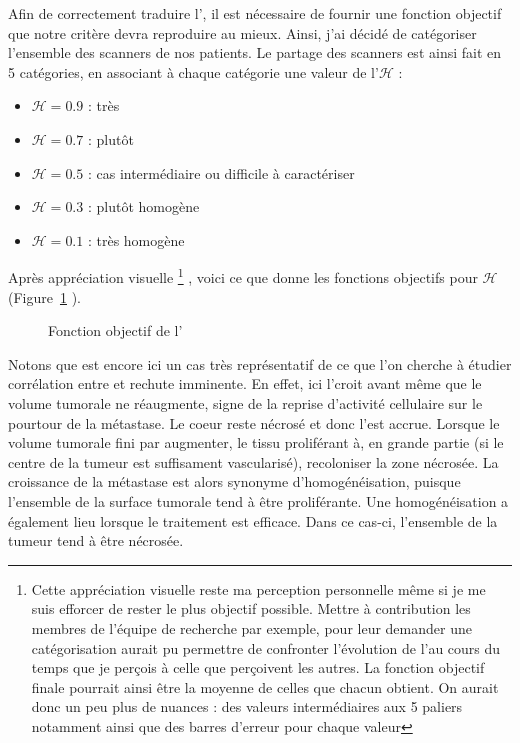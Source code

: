 \documentclass[main.tex]{subfiles}
\begin{document}
Afin de correctement traduire l'\hetero, il est nécessaire de fournir une fonction objectif que notre critère devra reproduire au mieux. Ainsi, j'ai décidé de catégoriser l'ensemble des scanners de nos patients. Le partage des scanners est ainsi fait en 5 catégories, en associant à chaque catégorie une valeur de l'\hetero $\mathscr{H}$ :
\begin{itemize}
\item $\mathscr{H}=0.9$ : très \heterogene
\item $\mathscr{H}=0.7$ : plutôt \heterogene
\item $\mathscr{H}=0.5$ : cas intermédiaire ou difficile à caractériser
\item $\mathscr{H}=0.3$ : plutôt homogène
\item  $\mathscr{H}=0.1$ : très homogène
\end{itemize}
Après appréciation visuelle \footnote{\samepage Cette appréciation visuelle reste ma perception personnelle même si je me suis efforcer de rester le plus objectif possible. Mettre à contribution les membres de l'équipe de recherche par exemple, pour leur demander une catégorisation aurait pu permettre de confronter l'évolution de l'\hetero au cours du temps que je perçois à celle que perçoivent les autres. La fonction objectif finale pourrait ainsi être la moyenne de celles que chacun obtient. On aurait donc un peu plus de nuances : des valeurs intermédiaires aux 5 paliers notamment ainsi que des barres d'erreur pour chaque valeur}
, voici ce que donne les fonctions objectifs pour $\mathscr{H}$ (\cf  Figure~\ref{fig:hetero_visuelle} ).

\begin{figure}
\caption{\label{fig:hetero_visuelle}Fonction objectif de l'\hetero}
\end{figure}

Notons que \Nber est encore ici un cas très représentatif de ce que l'on cherche à étudier \ie corrélation entre \hetero et rechute imminente. En effet, ici l'\hetero croit avant même que le volume tumorale ne réaugmente, signe de la reprise d'activité cellulaire sur le pourtour de la métastase. Le coeur reste nécrosé et donc l'\hetero est accrue. Lorsque le volume tumorale fini par augmenter, le tissu proliférant à, en grande partie (si le centre de la tumeur est suffisament vascularisé), recoloniser la zone nécrosée. La croissance de la métastase est alors synonyme d'homogénéisation, puisque l'ensemble de la surface tumorale tend à être proliférante. Une homogénéisation a également lieu lorsque le traitement est efficace. Dans ce cas-ci, l'ensemble de la tumeur tend à être nécrosée.
\end{document}
